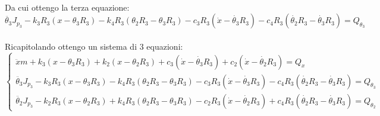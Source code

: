 \documentclass{article}
\begin{document}
\\
Da cui ottengo la terza equazione: 
\\
\begin{equation*}
 \ddot{\theta_3}J_{p_3} - k_{3}R_{3}(x - \theta_{3}R_{3}) - k_{4}R_3(\theta_{2}R_3 - \theta_{3}R_{3}) - c_{3}R_{3}(\dot{x}-\dot{\theta_3}R_{3}) - c_{4}R_{3}(\dot{\theta_2}R_3 - \dot{\theta_{3}}R_{3}) = Q_{\theta_3}
\end{equation*}
\\
Ricapitolando ottengo un sistema di 3 equazioni:
\begin{equation*}
\begin{cases}
 \ddot{x}m + k_{3}(x-\theta_{3}R_{3}) + k_{2}(x- \theta_{2}R_{3})+ c_{3}(\dot{x}-\dot{\theta_3}R_{3}) + c_{2}(\dot{x} - \dot{\theta_{2}}R_{3}) = Q_x\\
 \ddot{\theta_3}J_{p_3} - k_{3}R_{3}(x - \theta_{3}R_{3}) - k_{4}R_3(\theta_{2}R_3 - \theta_{3}R_{3}) - c_{3}R_{3}(\dot{x}-\dot{\theta_3}R_{3}) - c_{4}R_{3}(\dot{\theta_2}R_3 - \dot{\theta_{3}}R_{3}) = Q_{\theta_3}\\
 \ddot{\theta_2}J_{p_3} - k_{2}R_{3}(x - \theta_{2}R_{3}) + k_{4}R_3(\theta_{2}R_3 - \theta_{3}R_{3}) - c_{2}R_{3}(\dot{x}-\dot{\theta_2}R_{3}) + c_{4}R_{3}(\dot{\theta_2}R_3 - \dot{\theta_{3}}R_{3}) = Q_{\theta_2}
\end{cases}
\end{equation*}
\end{document}
